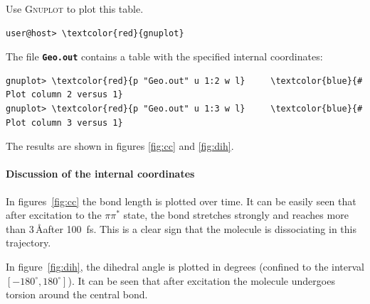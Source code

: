 \documentclass[a4paper,11pt,DIV=15,openany]{scrbook}
\newcommand{\ttt}[1]{\textbf{\texttt{#1}}}
\begin{document}
Use \textsc{Gnuplot} to plot this table. 
\begin{Verbatim}[commandchars=\\\{\}]
user@host> \textcolor{red}{gnuplot}
\end{Verbatim}
The file \ttt{Geo.out} contains a table with the specified internal coordinates:
\begin{oframed}
\footnotesize\begin{Verbatim}[commandchars=\\\{\}]
gnuplot> \textcolor{red}{p "Geo.out" u 1:2 w l}     \textcolor{blue}{# Plot column 2 versus 1}
gnuplot> \textcolor{red}{p "Geo.out" u 1:3 w l}     \textcolor{blue}{# Plot column 3 versus 1}
\end{Verbatim}
\end{oframed}

\normalsize
The results are shown in figures \ref{fig:cc} and \ref{fig:dih}.

\paragraph{Discussion of the internal coordinates} 

In figures~\ref{fig:cc} the  bond length is plotted over time. It can be easily seen that after excitation to the $\pi\pi^*$ state, the  bond stretches strongly and reaches more than 3\,\AA after 100~fs.
This is a clear sign that the  molecule is dissociating in this trajectory.

In figure~\ref{fig:dih}, the dihedral angle  is plotted in degrees (confined to the interval $[-180^\circ,180^\circ]$). 
It can be seen that after excitation the molecule undergoes torsion around the central bond.
\end{document}

